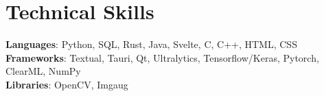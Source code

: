 \documentclass[letterpaper,11pt]{article}
\begin{document}
%
\section{Technical Skills}
 \begin{itemize}[leftmargin=0.15in, label={}]
    \small{\item{
     \textbf{Languages}{: Python, SQL, Rust, Java, Svelte, C, C++, HTML, CSS} \\
     \textbf{Frameworks}{: Textual, Tauri, Qt, Ultralytics, Tensorflow/Keras, Pytorch, ClearML, NumPy} \\
     \textbf{Libraries}{: OpenCV, Imgaug} \\
    }}
 \end{itemize}


\end{document}

